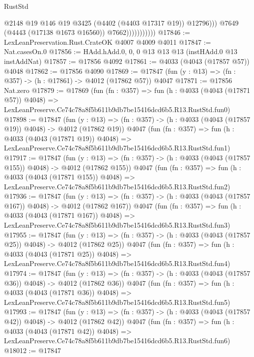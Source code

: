 \begin{lexlean}{RustStd}
\begin{coremodule}
                                @2148
                                @19
                                @146
                                @19
                                @3425
                                (@4402 (@4403 @17317 @19))
                                @12796)))
                          @7649
                          (@4443 (@17138 @1673 @16560))
                          @7662)))))))))))
@17846 := LexLeanPreservation.Rust.CrateOK @4007 @4009 @4011
@17847 := Nat.casesOn.{0}
@17856 := HAdd.hAdd.{0, 0, 0} @13 @13 @13 (instHAdd.{0} @13 instAddNat)
@17857 := @17856 @4092
@17861 := @4033 (@4043 (@17857 @57)) @4048
@17862 := @17856 @4090
@17869 := @17847 (fun (y : @13) => (fn : @357) -> (h : @17861) -> @4012 (@17862 @57)) @4047
@17871 := @17856 Nat.zero
@17879 := @17869
    (fun (fn : @357) =>
    fun (h : @4033 (@4043 (@17871 @57)) @4048) =>
    LexLeanPreserve.Ce74c78a8f5b611b9db7be15416dcd6b5.R13.RustStd.fun0)
@17898 := @17847
    (fun (y : @13) => (fn : @357) -> (h : @4033 (@4043 (@17857 @19)) @4048) -> @4012 (@17862 @19))
    @4047
    (fun (fn : @357) =>
    fun (h : @4033 (@4043 (@17871 @19)) @4048) =>
    LexLeanPreserve.Ce74c78a8f5b611b9db7be15416dcd6b5.R13.RustStd.fun1)
@17917 := @17847
    (fun (y : @13) => (fn : @357) -> (h : @4033 (@4043 (@17857 @155)) @4048) -> @4012 (@17862 @155))
    @4047
    (fun (fn : @357) =>
    fun (h : @4033 (@4043 (@17871 @155)) @4048) =>
    LexLeanPreserve.Ce74c78a8f5b611b9db7be15416dcd6b5.R13.RustStd.fun2)
@17936 := @17847
    (fun (y : @13) => (fn : @357) -> (h : @4033 (@4043 (@17857 @167)) @4048) -> @4012 (@17862 @167))
    @4047
    (fun (fn : @357) =>
    fun (h : @4033 (@4043 (@17871 @167)) @4048) =>
    LexLeanPreserve.Ce74c78a8f5b611b9db7be15416dcd6b5.R13.RustStd.fun3)
@17955 := @17847
    (fun (y : @13) => (fn : @357) -> (h : @4033 (@4043 (@17857 @25)) @4048) -> @4012 (@17862 @25))
    @4047
    (fun (fn : @357) =>
    fun (h : @4033 (@4043 (@17871 @25)) @4048) =>
    LexLeanPreserve.Ce74c78a8f5b611b9db7be15416dcd6b5.R13.RustStd.fun4)
@17974 := @17847
    (fun (y : @13) => (fn : @357) -> (h : @4033 (@4043 (@17857 @36)) @4048) -> @4012 (@17862 @36))
    @4047
    (fun (fn : @357) =>
    fun (h : @4033 (@4043 (@17871 @36)) @4048) =>
    LexLeanPreserve.Ce74c78a8f5b611b9db7be15416dcd6b5.R13.RustStd.fun5)
@17993 := @17847
    (fun (y : @13) => (fn : @357) -> (h : @4033 (@4043 (@17857 @42)) @4048) -> @4012 (@17862 @42))
    @4047
    (fun (fn : @357) =>
    fun (h : @4033 (@4043 (@17871 @42)) @4048) =>
    LexLeanPreserve.Ce74c78a8f5b611b9db7be15416dcd6b5.R13.RustStd.fun6)
@18012 := @17847

\end{coremodule}
\end{lexlean}

